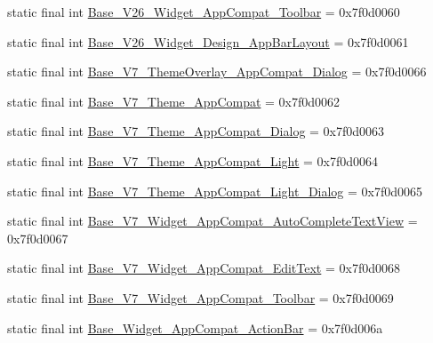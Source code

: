 \begin{DoxyCompactItemize}
\item 
static final int \mbox{\hyperlink{classandroid_1_1support_1_1design_1_1_r_1_1style_a9714c5b36503280ef8afb4f77d2f0358}{Base\+\_\+\+V26\+\_\+\+Widget\+\_\+\+App\+Compat\+\_\+\+Toolbar}} = 0x7f0d0060
\item 
static final int \mbox{\hyperlink{classandroid_1_1support_1_1design_1_1_r_1_1style_a888ffd10214b01ef0030b8012ca65b10}{Base\+\_\+\+V26\+\_\+\+Widget\+\_\+\+Design\+\_\+\+App\+Bar\+Layout}} = 0x7f0d0061
\item 
static final int \mbox{\hyperlink{classandroid_1_1support_1_1design_1_1_r_1_1style_a5366aa427cc00f440950911dbcabd35d}{Base\+\_\+\+V7\+\_\+\+Theme\+Overlay\+\_\+\+App\+Compat\+\_\+\+Dialog}} = 0x7f0d0066
\item 
static final int \mbox{\hyperlink{classandroid_1_1support_1_1design_1_1_r_1_1style_ac307f81dfe0e14e01c0963d9cd722432}{Base\+\_\+\+V7\+\_\+\+Theme\+\_\+\+App\+Compat}} = 0x7f0d0062
\item 
static final int \mbox{\hyperlink{classandroid_1_1support_1_1design_1_1_r_1_1style_a31a92314ed1ac7dbe3564f1d79411770}{Base\+\_\+\+V7\+\_\+\+Theme\+\_\+\+App\+Compat\+\_\+\+Dialog}} = 0x7f0d0063
\item 
static final int \mbox{\hyperlink{classandroid_1_1support_1_1design_1_1_r_1_1style_abe04237f3a2ce7821478da9f45a9dff7}{Base\+\_\+\+V7\+\_\+\+Theme\+\_\+\+App\+Compat\+\_\+\+Light}} = 0x7f0d0064
\item 
static final int \mbox{\hyperlink{classandroid_1_1support_1_1design_1_1_r_1_1style_a991ccb5eb4946b399bde90052ef1e6e3}{Base\+\_\+\+V7\+\_\+\+Theme\+\_\+\+App\+Compat\+\_\+\+Light\+\_\+\+Dialog}} = 0x7f0d0065
\item 
static final int \mbox{\hyperlink{classandroid_1_1support_1_1design_1_1_r_1_1style_ad851a8db0e50a006775dd76e7efa50fe}{Base\+\_\+\+V7\+\_\+\+Widget\+\_\+\+App\+Compat\+\_\+\+Auto\+Complete\+Text\+View}} = 0x7f0d0067
\item 
static final int \mbox{\hyperlink{classandroid_1_1support_1_1design_1_1_r_1_1style_a5143acab4e9a04013d7635ffc30fa84c}{Base\+\_\+\+V7\+\_\+\+Widget\+\_\+\+App\+Compat\+\_\+\+Edit\+Text}} = 0x7f0d0068
\item 
static final int \mbox{\hyperlink{classandroid_1_1support_1_1design_1_1_r_1_1style_a03c5401b8fb72009859d68e558da6a62}{Base\+\_\+\+V7\+\_\+\+Widget\+\_\+\+App\+Compat\+\_\+\+Toolbar}} = 0x7f0d0069
\item 
static final int \mbox{\hyperlink{classandroid_1_1support_1_1design_1_1_r_1_1style_a5b57339be3b00ec4fbc6d3baa428c01b}{Base\+\_\+\+Widget\+\_\+\+App\+Compat\+\_\+\+Action\+Bar}} = 0x7f0d006a

\end{DoxyCompactItemize}
